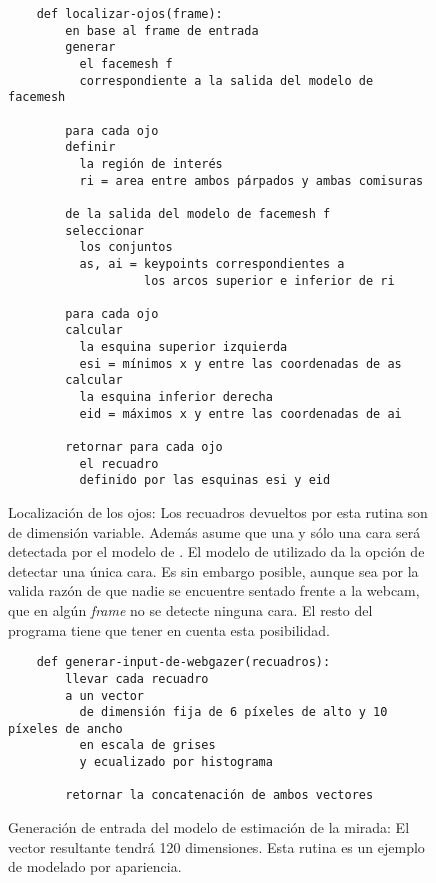   \begin{figure}
    \centering
    \begin{verbatim}
    def localizar-ojos(frame):
        en base al frame de entrada
        generar
          el facemesh f
          correspondiente a la salida del modelo de facemesh

        para cada ojo
        definir
          la región de interés
          ri = area entre ambos párpados y ambas comisuras
        
        de la salida del modelo de facemesh f
        seleccionar
          los conjuntos
          as, ai = keypoints correspondientes a
                   los arcos superior e inferior de ri
        
        para cada ojo
        calcular
          la esquina superior izquierda
          esi = mínimos x y entre las coordenadas de as
        calcular
          la esquina inferior derecha
          eid = máximos x y entre las coordenadas de ai
      
        retornar para cada ojo
          el recuadro
          definido por las esquinas esi y eid\end{verbatim}

    
    \caption{Localización de los ojos: Los recuadros devueltos por esta rutina son de dimensión variable.
    Además asume que una y sólo una cara será detectada por el modelo de
    \facemesh.
    El modelo de \tfjs utilizado da la opción de detectar una única cara.
    Es sin embargo posible, aunque sea por la valida razón de que nadie se
    encuentre sentado frente a la webcam, que en algún \textit{frame} no se
    detecte ninguna cara.
    El resto del programa tiene que tener en cuenta esta posibilidad.}
    \label{fig:eyes-localization}
  \end{figure}

  \begin{figure}
    \begin{verbatim}
    def generar-input-de-webgazer(recuadros):
        llevar cada recuadro
        a un vector
          de dimensión fija de 6 píxeles de alto y 10 píxeles de ancho
          en escala de grises
          y ecualizado por histograma

        retornar la concatenación de ambos vectores\end{verbatim}
    
    \caption{Generación de entrada del modelo de estimación de la mirada: El vector resultante tendrá 120 dimensiones.
    Esta rutina es un ejemplo de modelado por apariencia.}
    \label{fig:eye-features-to-model-input}
  \end{figure}

